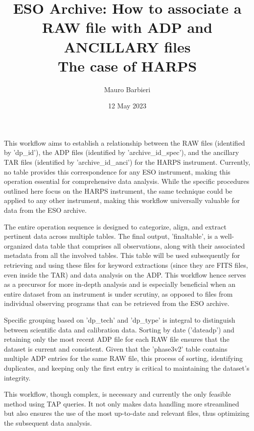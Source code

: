 \documentclass[a4paper,12pt]{article}
\author{Mauro Barbieri}
\date{12 May 2023}
\title{ESO Archive: How to associate a RAW file with ADP and ANCILLARY files\\
      The case of HARPS}
\begin{document}
\maketitle


This workflow aims to establish a relationship between the RAW files (identified by 'dp\_id'), the ADP files (identified by 'archive\_id\_spec'), 
and the ancillary TAR files (identified by 'archive\_id\_anci') for the HARPS instrument.
Currently, no table provides this correspondence for any ESO instrument, making this operation essential for comprehensive data analysis. 
While the specific procedures outlined here focus on the HARPS instrument, the same technique could be applied to any other instrument,
making this workflow universally valuable for data from the ESO archive.

The entire operation sequence is designed to categorize, align, and extract pertinent data across multiple tables. 
The final output, 'finaltable', is a well-organized data table that comprises all observations, along with their associated metadata from all the involved tables. 
This table will be used subsequently for retrieving and using these files for keyword extractions (since they are FITS files, even inside the TAR) and data analysis on the ADP. 
This workflow hence serves as a precursor for more in-depth analysis and is especially beneficial when an entire dataset from an instrument is under scrutiny, 
  as opposed to files from individual observing programs that can be retrieved from the ESO archive.

Specific grouping based on 'dp\_tech' and 'dp\_type' is integral to distinguish between scientific data and calibration data. 
Sorting by date ('dateadp') and retaining only the most recent ADP file for each RAW file ensures that the dataset is current and consistent. 
Given that the 'phase3v2' table contains multiple ADP entries for the same RAW file, this process of sorting, identifying duplicates, and 
keeping only the first entry is critical to maintaining the dataset's integrity.

This workflow, though complex, is necessary and currently the only feasible method using TAP queries. 
It not only makes data handling more streamlined but also ensures the use of the most up-to-date and relevant files, thus optimizing the subsequent data analysis.
\end{document}
